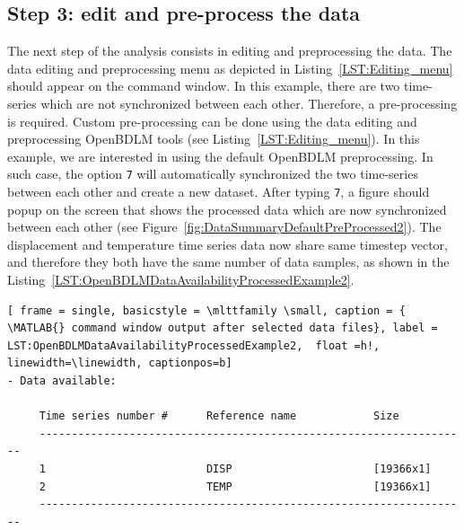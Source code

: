 \subsection{Step 3: edit and pre-process the data}

The next step of the analysis consists in editing and preprocessing the data.
The data editing and preprocessing menu as depicted in Listing~\ref{LST:Editing_menu} should appear on the \MATLAB{} command window.
In this example, there are two time-series which are not synchronized between each other.
Therefore, a pre-processing is required.
Custom pre-processing can be done using the data editing and preprocessing OpenBDLM tools (see Listing~\ref{LST:Editing_menu}).
In this example, we are interested in using the default OpenBDLM preprocessing.
In such case, the option \colorbox{light-gray}{\lstinline[basicstyle = \mlttfamily \small, backgroundcolor = \color{light-gray}]!7!} will automatically synchronized the two time-series between each other and create a new dataset.
After typing  \colorbox{light-gray}{\lstinline[basicstyle = \mlttfamily \small, backgroundcolor = \color{light-gray}]!7!}, a figure should popup on the screen that shows the processed data which are now synchronized between each other (see Figure~\ref{fig:DataSummaryDefaultPreProcessed2}). 
The displacement and temperature time series data now share same timestep vector, and therefore they both have the same number of data samples, as shown in the Listing~\ref{LST:OpenBDLMDataAvailabilityProcessedExample2}.

 \begin{lstlisting}[ frame = single, basicstyle = \mlttfamily \small, caption = { \MATLAB{} command window output after selected data files}, label = LST:OpenBDLMDataAvailabilityProcessedExample2,  float =h!, linewidth=\linewidth, captionpos=b]
- Data available: 
 
     Time series number #      Reference name            Size                     	
     -------------------------------------------------------------------
     1                         DISP                      [19366x1]                	
     2                         TEMP                      [19366x1]                	
     -------------------------------------------------------------------
\end{lstlisting}


